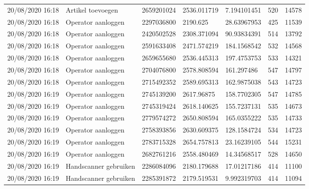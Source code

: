 \begin{tiny}
\begin{longtable}{lllllll}
    20/08/2020 16:18 & Artikel toevoegen     & 2659201024        & 2536.011719 & 7.194101451           & 520              & 14578            \\
    20/08/2020 16:18 & Operator aanloggen    & 2297036800        & 2190.625    & 28.63967953           & 425              & 11539            \\
    20/08/2020 16:18 & Operator aanloggen    & 2420502528        & 2308.371094 & 90.93834391           & 514              & 13792            \\
    20/08/2020 16:18 & Operator aanloggen    & 2591633408        & 2471.574219 & 184.1568542           & 532              & 14568            \\
    20/08/2020 16:18 & Operator aanloggen    & 2659655680        & 2536.445313 & 197.4753753           & 533              & 14321            \\
    20/08/2020 16:18 & Operator aanloggen    & 2704076800        & 2578.808594 & 161.297486            & 547              & 14797            \\
    20/08/2020 16:18 & Operator aanloggen    & 2715492352        & 2589.695313 & 162.9875038           & 543              & 14723            \\
    20/08/2020 16:19 & Operator aanloggen    & 2745139200        & 2617.96875  & 158.7702305           & 547              & 14785            \\
    20/08/2020 16:19 & Operator aanloggen    & 2745319424        & 2618.140625 & 155.7237131           & 535              & 14673            \\
    20/08/2020 16:19 & Operator aanloggen    & 2779574272        & 2650.808594 & 165.0355222           & 535              & 14733            \\
    20/08/2020 16:19 & Operator aanloggen    & 2758393856        & 2630.609375 & 128.1584724           & 534              & 14723            \\
    20/08/2020 16:19 & Operator aanloggen    & 2783715328        & 2654.757813 & 23.16239105           & 544              & 15231            \\
    20/08/2020 16:19 & Operator aanloggen    & 2682761216        & 2558.480469 & 14.34568517           & 528              & 14650            \\
    20/08/2020 16:19 & Handscanner gebruiken & 2286084096        & 2180.179688 & 17.01217186           & 414              & 11100            \\
    20/08/2020 16:19 & Handscanner gebruiken & 2285391872        & 2179.519531 & 9.992319703           & 414              & 11094            \\

\end{longtable}
\end{tiny}

